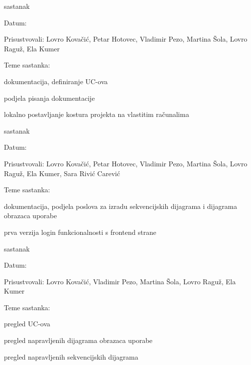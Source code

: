\begin{packed_enum}
			\item  sastanak
			\item[] \begin{packed_item}
				\item Datum: 
				\item Prisustvovali: Lovro Kovačić, Petar Hotovec, Vladimir Pezo, Martina Šola, Lovro Raguž, Ela Kumer
				\item Teme sastanka:
				\begin{packed_item}
					\item  dokumentacija, definiranje UC-ova
					\item  podjela pisanja dokumentacije
					\item  lokalno postavljanje kostura projekta na vlastitim računalima
				\end{packed_item}
			\end{packed_item}
			
			\item  sastanak
			\item[] \begin{packed_item}
				\item Datum: \DTMdisplaydate{2022}{11}{2}{-1}
				\item Prisustvovali: Lovro Kovačić, Petar Hotovec, Vladimir Pezo, Martina Šola, Lovro Raguž, Ela Kumer, Sara Rivić Carević
				\item Teme sastanka:
				\begin{packed_item}
					\item  dokumentacija, podjela poslova za izradu sekvencijskih dijagrama i dijagrama obrazaca uporabe
					\item  prva verzija login funkcionalnosti s frontend strane
				\end{packed_item}
			\end{packed_item}
			
			\item  sastanak
			\item[] \begin{packed_item}
				\item Datum: \DTMdisplaydate{2022}{11}{3}{-1}
				\item Prisustvovali: Lovro Kovačić, Vladimir Pezo, Martina Šola, Lovro Raguž, Ela Kumer
				\item Teme sastanka:
				\begin{packed_item}
				    \item  pregled UC-ova
					\item  pregled napravljenih dijagrama obrazaca uporabe
					\item  pregled napravljenih sekvencijskih dijagrama
				\end{packed_item}
			\end{packed_item}
			

\end{packed_enum}
